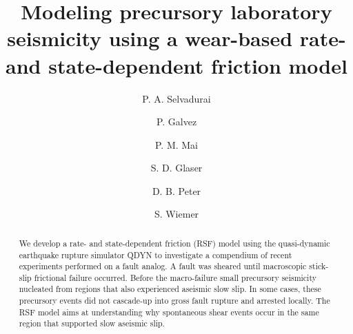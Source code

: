 \documentclass[preprint,1p, 10pt,authoryear]{elsarticle}
\begin{document}
\begin{frontmatter}



\title{Modeling precursory laboratory seismicity using a wear-based rate- and state-dependent friction model}

 \author[1]{P. A. Selvadurai }
\author[2]{P. Galvez}
\author[2]{P. M. Mai}
\author[3]{S. D. Glaser} 
\author[2]{D. B. Peter}
\author[1]{S. Wiemer} 



\address[1]{Swiss Seismological Service, ETH Zurich, Zurich, Switzerland}
\address[2]{King Abdullah University of Science and Technology, Thuwal, Saudi Arabia}
\address[3]{Civil and Environmental Engineering, University of California, Berkeley, California, USA}



\begin{abstract}
We develop a rate- and state-dependent friction (RSF) model using the quasi-dynamic earthquake rupture simulator QDYN to investigate a compendium of recent experiments  performed on a fault analog. A fault was sheared until macroscopic stick-slip frictional failure occurred. Before the macro-failure small precursory seismicity nucleated from regions that also experienced aseismic slow slip. In some cases, these precursory events did not cascade-up into gross fault rupture and arrested locally. The RSF model aims at understanding why spontaneous shear events occur in the same region that supported slow aseismic slip.  


\end{abstract}
\end{frontmatter}
\end{document}
